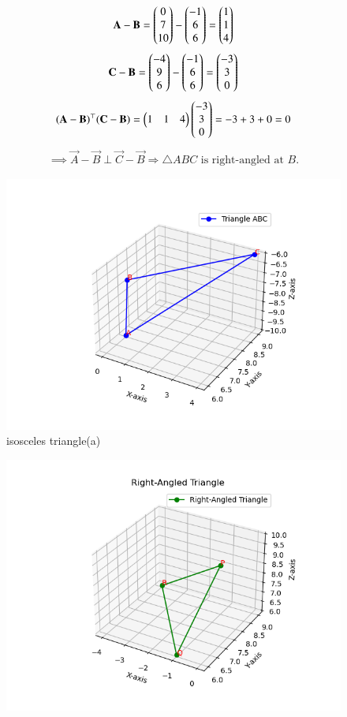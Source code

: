 \documentclass[journal]{IEEEtran}
\begin{document}
\begin{align}
\mathbf{A}-\mathbf{B} = \begin{pmatrix}0\\7\\10\end{pmatrix}-\begin{pmatrix}-1\\6\\6\end{pmatrix} 
= \begin{pmatrix}1\\1\\4\end{pmatrix}
\end{align}
\begin{align}
\mathbf{C}-\mathbf{B} = \begin{pmatrix}-4\\9\\6\end{pmatrix}-\begin{pmatrix}-1\\6\\6\end{pmatrix} 
= \begin{pmatrix}-3\\3\\0\end{pmatrix}
\end{align}
\begin{align}
(\mathbf{A}-\mathbf{B})^\top(\mathbf{C}-\mathbf{B}) 
= \begin{pmatrix}1&1&4\end{pmatrix}\begin{pmatrix}-3\\3\\0\end{pmatrix} = -3+3+0=0
\end{align}
\begin{align*}
\implies \vec{A}-\vec{B} \perp \vec{C}-\vec{B}  \Rightarrow  
\triangle ABC \text{ is right-angled at } B.
\end{align*}
\begin{figure}[H]
    \centering
    \includegraphics[width=0.8\columnwidth]{figs/fig1.png}
    \caption{isosceles triangle(a)}
    \label{fig:fig1}
\end{figure}
\begin{figure}[H]
    \centering
    \includegraphics[width=0.8\columnwidth]{figs/fig2.png}
    \caption{}
    \label{fig:fig2}
\end{figure}
\end{document}
